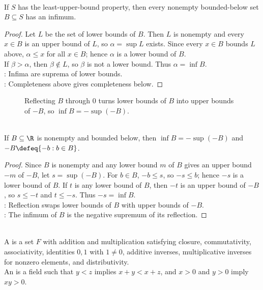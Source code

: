 \begin{theorem} \label{thm:lub-property-gives-glb-property} \\
If $S$ has the least-upper-bound property, then every nonempty bounded-below set $B\subseteq S$ has an infimum.
\begin{proof}
Let $L$ be the set of lower bounds of $B$. Then $L$ is nonempty and every $x\in B$ is an upper bound of $L$, so $\alpha=\sup L$ exists. Since every $x\in B$ bounds $L$ above, $\alpha\leq x$ for all $x\in B$; hence $\alpha$ is a lower bound of $B$.\\
If $\beta>\alpha$, then $\beta\notin L$, so $\beta$ is not a lower bound. Thus $\alpha=\inf B$.\\
: Infima are suprema of lower bounds.\\
: Completeness above gives completeness below.
\end{proof}
\end{theorem}

\begin{figure}[H]
  \centering
  
  \caption{Reflecting $B$ through $0$ turns lower bounds of $B$ into upper bounds of $-B$, so $\inf B=-\sup(-B)$.}
  \label{fig:infimum-reflection-via-supremum}
\end{figure}

\begin{corollary} \label{cor:infimum-as-negative-supremum} \\
If $B\subseteq\R$ is nonempty and bounded below, then $\inf B=-\sup(-B)$ and $-B\defeq\{-b:b\in B\}$.
\begin{proof}
Since $B$ is nonempty and any lower bound $m$ of $B$ gives an upper bound $-m$ of $-B$, let $s=\sup(-B)$. For $b\in B$, $-b\leq s$, so $-s\leq b$; hence $-s$ is a lower bound of $B$. If $t$ is any lower bound of $B$, then $-t$ is an upper bound of $-B$, so $s\leq -t$ and $t\leq -s$. Thus $-s=\inf B$.\\
: Reflection swaps lower bounds of $B$ with upper bounds of $-B$.\\
: The infimum of $B$ is the negative supremum of its reflection.
\end{proof}
\end{corollary}


\begin{definition} \label{def:field-and-ordered-field-analysis} \\
A  is a set $F$ with addition and multiplication satisfying closure, commutativity, associativity, identities $0,1$ with $1\neq0$, additive inverses, multiplicative inverses for nonzero elements, and distributivity.\\
An  is a field such that $y<z$ implies $x+y<x+z$, and $x>0$ and $y>0$ imply $xy>0$.
\end{definition}

